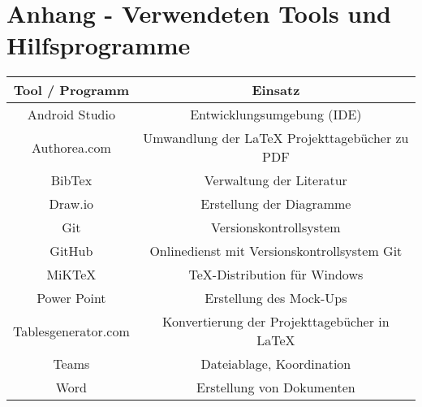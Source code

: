 
\section{Anhang - Verwendeten Tools und Hilfsprogramme}


\begin{tabular}{|c|c|} 
	\hline
	Tool / Programm & Einsatz \\ [0.5ex] 
	\hline \hline
	Android Studio & Entwicklungsumgebung (IDE) \\
	\hline
	Authorea.com & Umwandlung der LaTeX Projekttagebücher zu PDF \\
	\hline
	BibTex & Verwaltung der Literatur \\
	\hline
	Draw.io & Erstellung der Diagramme \\
	\hline
	Git & Versionskontrollsystem \\
	\hline
	GitHub & Onlinedienst mit Versionskontrollsystem Git \\
	\hline
	MiKTeX & TeX-Distribution für Windows \\
	\hline
	Power Point & Erstellung des Mock-Ups \\
	\hline
	Tablesgenerator.com & Konvertierung der Projekttagebücher in LaTeX \\
	\hline
	Teams & Dateiablage, Koordination \\
	\hline
	Word & Erstellung von Dokumenten
 \\
	\hline
\end{tabular}


	


